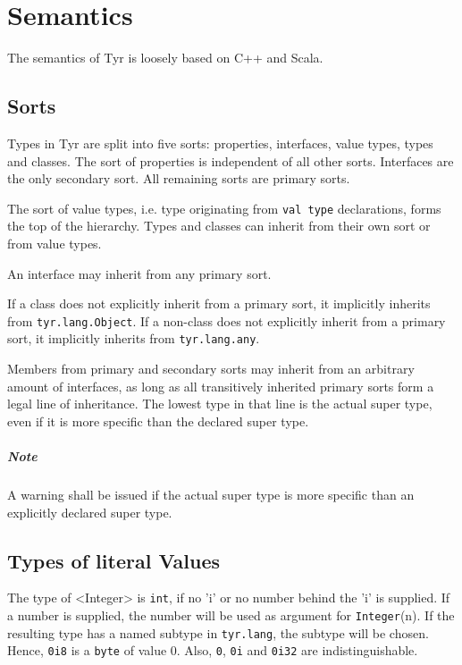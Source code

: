 \section{Semantics}

The semantics of Tyr is loosely based on C++ and Scala.

\subsection{Sorts}

Types in Tyr are split into five sorts: properties, interfaces, value types, types and classes.
The sort of properties is independent of all other sorts.
Interfaces are the only secondary sort.
All remaining sorts are primary sorts.

The sort of value types, i.e. type originating from \verb+val type+ declarations, forms the top of the hierarchy.
Types and classes can inherit from their own sort or from value types.

An interface may inherit from any primary sort.

If a class does not explicitly inherit from a primary sort, it implicitly inherits from \texttt{tyr.lang.Object}.
If a non-class does not explicitly inherit from a primary sort, it implicitly inherits from \texttt{tyr.lang.any}.

Members from primary and secondary sorts may inherit from an arbitrary amount of interfaces, as long as all transitively inherited primary sorts form a legal line of inheritance.
The lowest type in that line is the actual super type, even if it is more specific than the declared super type.

\subparagraph{Note} A warning shall be issued if the actual super type is more specific than an explicitly declared super type.



%


\subsection{Types of literal Values}

The type of <Integer> is \texttt{int}, if no 'i' or no number behind the 'i' is supplied.
If a number is supplied, the number will be used as argument for \texttt{Integer}(n).
If the resulting type has a named subtype in \texttt{tyr.lang}, the subtype will be chosen.
Hence, \texttt{0i8} is a \texttt{byte} of value 0.
Also, \texttt{0}, \texttt{0i} and \texttt{0i32} are indistinguishable.

